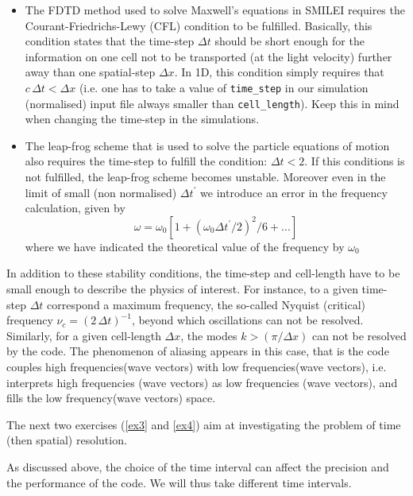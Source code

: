 \documentclass[11pt,a4paper]{article}
\newcommand{\code}[1] {{\color{classcolour}\texttt{#1}}}
\begin{document}
\begin{itemize}
\item The FDTD method used to solve Maxwell's equations in SMILEI requires the Courant-Friedrichs-Lewy (CFL) condition to be fulfilled. Basically, this condition states that the time-step $\Delta t$ should be short enough for the information on one cell not to be transported (at the light velocity) further away than one spatial-step $\Delta x$. In 1D, this condition simply requires that $c\,\Delta t < \Delta x$ (i.e. one has to take a value of \code{time\_step} in our simulation (normalised) input file always smaller than \code{cell\_length}). Keep this in mind when changing the time-step in the simulations.
\item  The leap-frog scheme that is used to solve the particle equations of motion also requires the time-step to fulfill the condition: $\Delta t < 2$. If this conditions is not fulfilled, the leap-frog scheme becomes unstable.
Moreover even in the limit of small (non normalised) $\Delta t^\prime$ we introduce an error in the frequency calculation, given by 
$$\omega = \omega_0  [1+ (\omega_0 \Delta t^\prime/2 )^2/6+... ]$$
where we have indicated the theoretical value of the frequency  by $\omega_0$
\end{itemize}

In addition to these stability conditions, the time-step and cell-length have to be small enough to describe the physics of interest. For instance, to a given time-step $\Delta t$ correspond a maximum frequency, the so-called Nyquist (critical) frequency $\nu_c =(2\,\Delta t)^{-1}$, beyond which oscillations can not be resolved. Similarly, for a given cell-length $\Delta x$, the modes $k>(\pi/\Delta x)$ can not be resolved by the code.  The phenomenon of aliasing appears in this case, that is the code couples high frequencies(wave vectors)  with low frequencies(wave vectors), i.e. interprets high frequencies (wave vectors) as low frequencies (wave vectors), and fills the low frequency(wave vectors) space. 

The next two exercises (\ref{ex3} and \ref{ex4}) aim at investigating the problem of time (then spatial) resolution. 

As discussed above, the choice of the time interval can affect the precision and the performance of the code. We will thus take different time intervals. 
\end{document}
